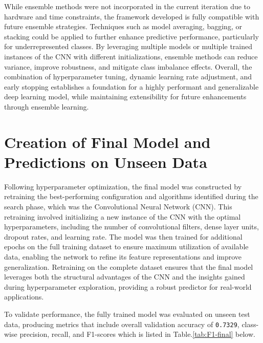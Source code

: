 \documentclass[conference]{IEEEtran}
\begin{document}
While ensemble methods were not incorporated in the current iteration due to hardware and time constraints, the framework developed is fully compatible with future ensemble strategies. Techniques such as model averaging, bagging, or stacking could be applied to further enhance predictive performance, particularly for underrepresented classes. By leveraging multiple models or multiple trained instances of the CNN with different initializations, ensemble methods can reduce variance, improve robustness, and mitigate class imbalance effects. Overall, the combination of hyperparameter tuning, dynamic learning rate adjustment, and early stopping establishes a foundation for a highly performant and generalizable deep learning model, while maintaining extensibility for future enhancements through ensemble learning.

\section{Creation of Final Model and Predictions on Unseen Data}

Following hyperparameter optimization, the final model was constructed by retraining the best-performing configuration and algorithms identified during the search phase, which was the  Convolutional Neural Network (CNN). This retraining involved initializing a new instance of the CNN with the optimal hyperparameters, including the number of convolutional filters, dense layer units, dropout rates, and learning rate. The model was then trained for additional epochs on the full training dataset to ensure maximum utilization of available data, enabling the network to refine its feature representations and improve generalization. Retraining on the complete dataset ensures that the final model leverages both the structural advantages of the CNN and the insights gained during hyperparameter exploration, providing a robust predictor for real-world applications.

To validate performance, the fully trained model was evaluated on unseen test data, producing metrics that include overall validation accuracy of \texttt{0.7329}, class-wise precision, recall, and F1-scores which is listed in Table.\ref{tab:F1-final} below.
\end{document}
